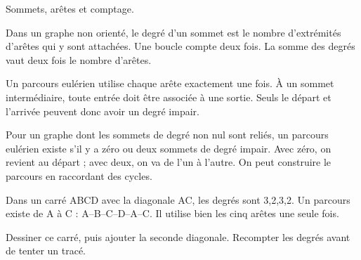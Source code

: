 \documentclass[11pt]{article}
\begin{document}
Sommets, arêtes et comptage.\par
{}
Dans un graphe non orienté, le degré d’un sommet est le nombre d’extrémités d’arêtes qui y sont attachées. Une boucle compte deux fois. La somme des degrés vaut deux fois le nombre d’arêtes.\par
Un parcours eulérien utilise chaque arête exactement une fois. À un sommet intermédiaire, toute entrée doit être associée à une sortie. Seuls le départ et l’arrivée peuvent donc avoir un degré impair.\par
Pour un graphe dont les sommets de degré non nul sont reliés, un parcours eulérien existe s’il y a zéro ou deux sommets de degré impair. Avec zéro, on revient au départ ; avec deux, on va de l’un à l’autre. On peut construire le parcours en raccordant des cycles.\par
{}
Dans un carré ABCD avec la diagonale AC, les degrés sont 3,2,3,2. Un parcours existe de A à C : A--B--C--D--A--C. Il utilise bien les cinq arêtes une seule fois.\par
\begin{center}\end{center}
Dessiner ce carré, puis ajouter la seconde diagonale. Recompter les degrés avant de tenter un tracé.\par
\end{document}
